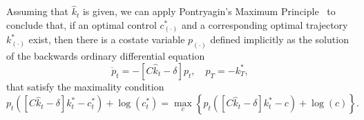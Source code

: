 Assuming that ${\hat k_t}$ is given, we can apply Pontryagin's Maximum Principle~\cite{bressan2007introduction}
to conclude that, if an optimal control $c^*_{(\cdot)}$ and a corresponding optimal trajectory $k^*_{(\cdot)}$ exist,
then there is a costate variable $p_{(\cdot)}$ defined implicitly as the solution of the backwards ordinary differential equation
\begin{equation}\label{economic_example:costate_ode}
    \dot p_t = -  \left[C{\hat k_t} - \delta \right] p_t, \quad p_T =  - k^*_T,
\end{equation}
that satisfy the maximality condition
\begin{equation}\label{economic_example:maximality_condition}
    p_t\left( \left[C {\hat k_t} - \delta \right]k^*_t - c^*_t \right) + \log(c^*_t) = 
    \max_c \left\{ p_t\left( \left[C {\hat k_t} - \delta \right]k^*_t - c \right) + \log(c) \right\}.
\end{equation}

